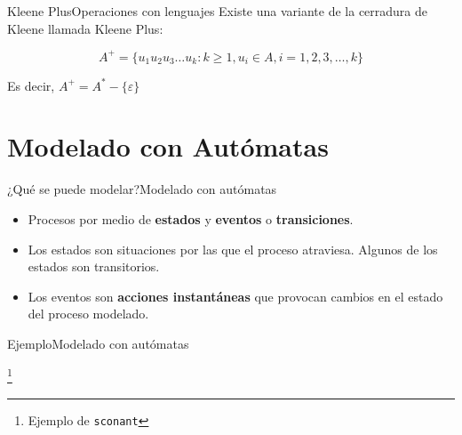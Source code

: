 \documentclass[spanish]{beamer}
\newcommand\blfootnote[1]{%
  \begingroup
  \renewcommand\thefootnote{}\footnote{#1}%
  \addtocounter{footnote}{-1}%
  \endgroup
}
\begin{document}
\begin{frame}{Kleene Plus}{Operaciones con lenguajes}
    Existe una variante de la cerradura de Kleene llamada \alert{Kleene Plus}: \pause

    \bigskip

    \begin{definition}
        \[A^{+} = \{u_1 u_2 u_3 \dots u_k : k \geq 1, u_i \in A, i = 1, 2, 3, \dots , k\}\]
    \end{definition} \pause

    \bigskip

    Es decir, $A^{+} = A^{*} - \{\varepsilon\}$
\end{frame}

\section{Modelado con Autómatas}
\label{sec:modeling}

\begin{frame}{¿Qué se puede modelar?}{Modelado con autómatas}

    \begin{itemize}
        \itemsep1.5ex
        \item Procesos por medio de \textbf{estados} y \textbf{eventos} o \textbf{transiciones}. \pause
        \item Los estados son situaciones por las que el proceso atraviesa. Algunos de los estados son transitorios. \pause
        \item Los eventos son \textbf{acciones instantáneas} que provocan cambios en el estado del proceso modelado.
    \end{itemize}

\end{frame}

\begin{frame}{Ejemplo}{Modelado con autómatas}
    \begin{center}
    \end{center}
    \blfootnote{Ejemplo de \texttt{sconant}}
\end{frame}
\end{document}
